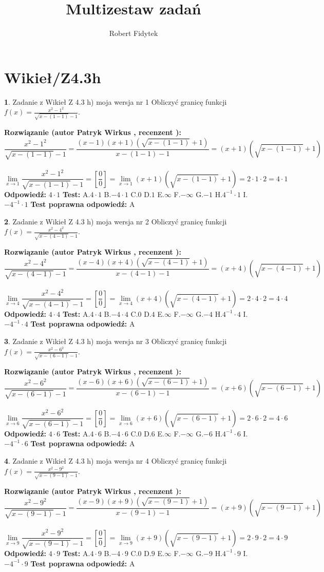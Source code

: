 \documentclass[12pt, a4paper]{article}
\title{Multizestaw zadań}
\author{Robert Fidytek}
\date{}
\theoremstyle{definition} %
\newtheorem{zad}{}
\newcommand{\kategoria}[1]{\section{#1}}
\newcommand{\zadStart}[1]{\begin{zad}#1\newline}
\newcommand{\zadStop}{\end{zad}}
\newcommand{\rozwStart}[2]{\noindent \textbf{Rozwiązanie (autor #1 , recenzent #2): }\newline}
\newcommand{\rozwStop}{\newline}
\newcommand{\odpStart}{\noindent \textbf{Odpowiedź:}\newline}
\newcommand{\odpStop}{\newline}
\newcommand{\testStart}{\noindent \textbf{Test:}\newline}
\newcommand{\testStop}{\newline}
\newcommand{\kluczStart}{\noindent \textbf{Test poprawna odpowiedź:}\newline}
\newcommand{\kluczStop}{\newline}
\begin{document}
\maketitle

\kategoria{Wikieł/Z4.3h}


\zadStart{Zadanie z Wikieł Z 4.3 h) moja wersja nr 1}
Obliczyć granicę funkcji $f(x)=\frac{x^{2} - 1^{2}}{\sqrt{x-(1-1)}-1}$.
\zadStop
\rozwStart{Patryk Wirkus}{}
$$\frac{x^{2} - 1^{2}}{\sqrt{x-(1-1)}-1}=\frac{(x-1)(x+1)(\sqrt{x-(1-1)}+1)}{x-(1-1)-1}=(x+1)(\sqrt{x-(1-1)}+1)$$
\\
$$\lim\limits_{x\to 1}\frac{x^{2} - 1^{2}}{\sqrt{x-(1-1)}-1}=[\frac{0}{0}]=
\lim\limits_{x\to 1}(x+1)(\sqrt{x-(1-1)}+1) = 2\cdot1 \cdot 2 = 4 \cdot 1$$
\rozwStop
\odpStart
$4\cdot1$
\odpStop
\testStart
A.$4\cdot1$
B.$-4\cdot1$
C.$0$
D.$1$
E.$\infty$
F.$-\infty$
G.$-1$
H.$4^{-1}\cdot1$
I.$-4^{-1}\cdot1$
\testStop
\kluczStart
A
\kluczStop



\zadStart{Zadanie z Wikieł Z 4.3 h) moja wersja nr 2}
Obliczyć granicę funkcji $f(x)=\frac{x^{2} - 4^{2}}{\sqrt{x-(4-1)}-1}$.
\zadStop
\rozwStart{Patryk Wirkus}{}
$$\frac{x^{2} - 4^{2}}{\sqrt{x-(4-1)}-1}=\frac{(x-4)(x+4)(\sqrt{x-(4-1)}+1)}{x-(4-1)-1}=(x+4)(\sqrt{x-(4-1)}+1)$$
\\
$$\lim\limits_{x\to 4}\frac{x^{2} - 4^{2}}{\sqrt{x-(4-1)}-1}=[\frac{0}{0}]=
\lim\limits_{x\to 4}(x+4)(\sqrt{x-(4-1)}+1) = 2\cdot4 \cdot 2 = 4 \cdot 4$$
\rozwStop
\odpStart
$4\cdot4$
\odpStop
\testStart
A.$4\cdot4$
B.$-4\cdot4$
C.$0$
D.$4$
E.$\infty$
F.$-\infty$
G.$-4$
H.$4^{-1}\cdot4$
I.$-4^{-1}\cdot4$
\testStop
\kluczStart
A
\kluczStop



\zadStart{Zadanie z Wikieł Z 4.3 h) moja wersja nr 3}
Obliczyć granicę funkcji $f(x)=\frac{x^{2} - 6^{2}}{\sqrt{x-(6-1)}-1}$.
\zadStop
\rozwStart{Patryk Wirkus}{}
$$\frac{x^{2} - 6^{2}}{\sqrt{x-(6-1)}-1}=\frac{(x-6)(x+6)(\sqrt{x-(6-1)}+1)}{x-(6-1)-1}=(x+6)(\sqrt{x-(6-1)}+1)$$
\\
$$\lim\limits_{x\to 6}\frac{x^{2} - 6^{2}}{\sqrt{x-(6-1)}-1}=[\frac{0}{0}]=
\lim\limits_{x\to 6}(x+6)(\sqrt{x-(6-1)}+1) = 2\cdot6 \cdot 2 = 4 \cdot 6$$
\rozwStop
\odpStart
$4\cdot6$
\odpStop
\testStart
A.$4\cdot6$
B.$-4\cdot6$
C.$0$
D.$6$
E.$\infty$
F.$-\infty$
G.$-6$
H.$4^{-1}\cdot6$
I.$-4^{-1}\cdot6$
\testStop
\kluczStart
A
\kluczStop



\zadStart{Zadanie z Wikieł Z 4.3 h) moja wersja nr 4}
Obliczyć granicę funkcji $f(x)=\frac{x^{2} - 9^{2}}{\sqrt{x-(9-1)}-1}$.
\zadStop
\rozwStart{Patryk Wirkus}{}
$$\frac{x^{2} - 9^{2}}{\sqrt{x-(9-1)}-1}=\frac{(x-9)(x+9)(\sqrt{x-(9-1)}+1)}{x-(9-1)-1}=(x+9)(\sqrt{x-(9-1)}+1)$$
\\
$$\lim\limits_{x\to 9}\frac{x^{2} - 9^{2}}{\sqrt{x-(9-1)}-1}=[\frac{0}{0}]=
\lim\limits_{x\to 9}(x+9)(\sqrt{x-(9-1)}+1) = 2\cdot9 \cdot 2 = 4 \cdot 9$$
\rozwStop
\odpStart
$4\cdot9$
\odpStop
\testStart
A.$4\cdot9$
B.$-4\cdot9$
C.$0$
D.$9$
E.$\infty$
F.$-\infty$
G.$-9$
H.$4^{-1}\cdot9$
I.$-4^{-1}\cdot9$
\testStop
\kluczStart
A
\kluczStop
\end{document}
